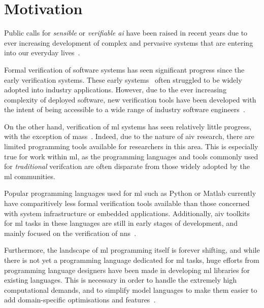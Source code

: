 \section{Motivation}

Public calls for \textit{sensible} or \textit{verifiable \Gls{ai}} have been raised in recent years due to ever increasing
development of complex and pervasive systems that are entering into our everyday lives~\citep{russell2016}.

Formal verification of software systems has seen significant progress since the early
verification systems. These early systems~\citep{polak1979, boyer1990, guaspari1993} often struggled to be 
widely adopted into industry applications. However, due to the ever increasing complexity of deployed
software, new verification tools have been developed with the intent of being accessible to a wide range
of industry software engineers~\citep{fisher2017}.

On the other hand, verification of \gls{ml} systems has 
seen relatively little progress, with the exception of \Glspl{mas}~\citep{lomuscio2017, kouvaros2016}.
Indeed, due to the nature of \gls{aiv} research, there are limited 
programming tools available for researchers in this area. This is especially true for work
within \gls{ml}, as the programming languages and tools commonly used for \textit{traditional} verifcation are often
disparate from those widely adopted by the \gls{ml} communities. 

Popular programming languages used for \gls{ml} such as Python or Matlab currently have comparitively less
formal verification tools available than those concerned with system infrastructure or embedded applications.
Additionally, \gls{aiv} toolkits for \gls{ml} tasks in these languages are still in early stages of development, and mainly focused
on the verification of \glspl{nn}~\citep{kokke2020}. 

Furthermore, the landscape of \gls{ml} programming itself is forever shifting, and while there is not yet a programming 
language dedicated for \gls{ml} tasks, huge efforts from programming language designers have been made 
in developing \gls{ml} libraries for existing languages. This is necessary in order to handle the 
extremely high computational demands, and to simplify 
model languages to make them easier to add domain-specific optimisations and features~\citep{innes2017}.

